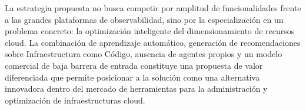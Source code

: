 La estrategia propuesta no busca competir por amplitud de funcionalidades frente a las grandes plataformas de observabilidad, sino por la especialización en un problema concreto: la optimización inteligente del dimensionamiento de recursos cloud. La combinación de aprendizaje automático, generación de recomendaciones sobre Infraestructura como Código, ausencia de agentes propios y un modelo comercial de baja barrera de entrada constituye una propuesta de valor diferenciada que permite posicionar a la solución como una alternativa innovadora dentro del mercado de herramientas para la administración y optimización de infraestructuras cloud.
